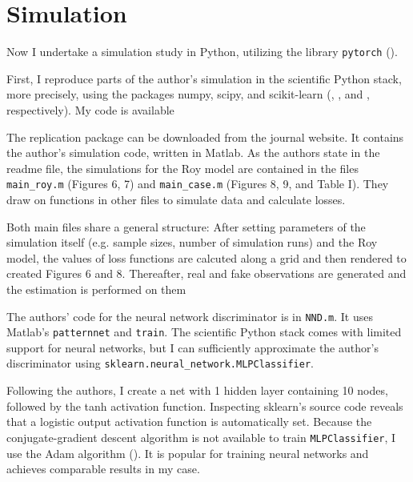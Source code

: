 \section{Simulation}
\label{sec:simulation}

Now I undertake a simulation study in Python, utilizing the library \texttt{pytorch} (\textcite{Ansel_PyTorch_2_Faster_2024}).

First, I reproduce parts of the author's simulation in the scientific Python stack, more precisely, using the packages numpy, scipy, and scikit-learn (\textcite{harris2020array}, \textcite{2020SciPy-NMeth}, and \textcite{scikit-learn}, respectively).
My code is available %

The replication package can be downloaded from the journal website.
It contains the author's simulation code, written in Matlab. %
As the authors state in the readme file, the simulations for the Roy model are contained in the files \texttt{main\_roy.m} (Figures 6, 7) and \texttt{main\_case.m} (Figures 8, 9, and Table I).
They draw on functions in other files to simulate data and calculate losses.

Both main files share a general structure:
After setting parameters of the simulation itself (e.g. sample sizes, number of simulation runs) and the Roy model, the values of loss functions are calcuted along a grid and then rendered to created Figures 6 and 8.
Thereafter, real and fake observations are generated and the estimation is performed on them


The authors' code for the neural network discriminator is in \texttt{NND.m}.
It uses Matlab's \texttt{patternnet} and \texttt{train}.
The scientific Python stack comes with limited support for neural networks, but I can sufficiently approximate the author's discriminator using \texttt{sklearn.neural\_network.MLPClassifier}.

Following the authors, I create a net with 1 hidden layer containing 10 nodes, followed by the tanh activation function.
Inspecting sklearn's source code reveals that a logistic output activation function is automatically set. %
Because the conjugate-gradient descent algorithm is not available to train \texttt{MLPClassifier}, I use the Adam algorithm (\textcite{diederik2014adam}).
It is popular for training neural networks and achieves comparable results in my case. %

